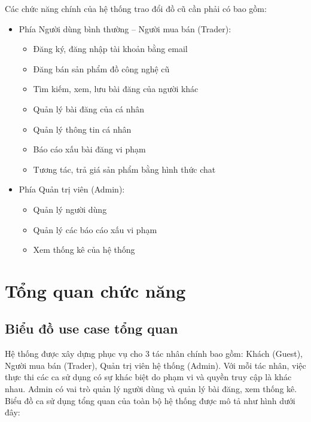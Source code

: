 \documentclass[../DoAn.tex]{subfiles}
\begin{document}
Các chức năng chính của hệ thống trao đổi đồ cũ cần phải có bao gồm:
\begin{itemize}
    \item Phía Người dùng bình thường – Người mua bán (Trader):
    \begin{itemize}
        \item Đăng ký, đăng nhập tài khoản bằng email
        \item Đăng bán sản phẩm đồ công nghệ cũ
        \item Tìm kiếm, xem, lưu bài đăng của người khác
        \item Quản lý bài đăng của cá nhân
        \item Quản lý thông tin cá nhân
        \item Báo cáo xấu bài đăng vi phạm
        \item Tương tác, trả giá sản phẩm bằng hình thức chat
    \end{itemize}
    \item Phía Quản trị viên (Admin):
        \begin{itemize}
        \item Quản lý người dùng
        \item Quản lý các báo cáo xấu vi phạm
        \item Xem thống kê của hệ thống
    \end{itemize}
\end{itemize}


\section{Tổng quan chức năng}

\subsection{Biểu đồ use case tổng quan}
\label{subsection:2.2.1}
Hệ thống được xây dựng phục vụ cho 3 tác nhân chính bao gồm: Khách (Guest), Người mua bán (Trader), Quản trị viên hệ thống (Admin). Với mỗi tác nhân, việc thực thi các ca sử dụng có sự khác biệt do phạm vi và quyền truy cập là khác nhau. Admin có vai trò quản lý người dùng và quản lý bài đăng, xem thống kê. Biểu đồ ca sử dụng tổng quan của toàn bộ hệ thống được mô tả như hình dưới đây:
\end{document}
